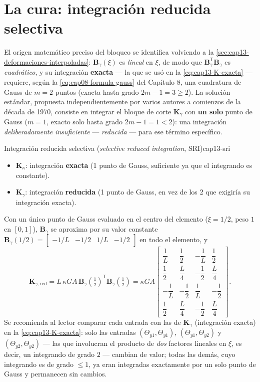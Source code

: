 \section{La cura: integración reducida selectiva}
\label{sec:cap13-integracion-reducida}

El origen matemático preciso del bloqueo se identifica volviendo a la \cref{sec:cap13-deformaciones-interpoladas}: $\bm B_\gamma(\xi)$ es \emph{lineal} en $\xi$, de modo que $\bm B_\gamma^{\mathsf T}\bm B_\gamma$ es \emph{cuadrático}, y su integración \textbf{exacta} --- la que se usó en la \cref{eq:cap13-K-exacta} --- requiere, según la \cref{eq:cap08-formula-gauss} del Capítulo 8, una cuadratura de Gauss de $m=2$ puntos (exacta hasta grado $2m-1=3\geq2$). La solución estándar, propuesta independientemente por varios autores a comienzos de la década de 1970, consiste en integrar el bloque de corte $\bm K_\gamma$ con \textbf{un solo} punto de Gauss ($m=1$, exacto solo hasta grado $2m-1=1<2$): una integración \emph{deliberadamente insuficiente} --- \emph{reducida} --- para ese término específico.

\begin{ecnimportante}{Integración reducida selectiva (\emph{selective reduced integration}, SRI)}{cap13-sri}
\begin{itemize}[leftmargin=1.6em]
  \item $\bm K_\kappa$: integración \textbf{exacta} (1 punto de Gauss, suficiente ya que el integrando es constante).
  \item $\bm K_\gamma$: integración \textbf{reducida} (1 punto de Gauss, en vez de los 2 que exigiría su integración exacta).
\end{itemize}
Con un único punto de Gauss evaluado en el centro del elemento ($\xi=1/2$, peso $1$ en $[0,1]$), $\bm B_\gamma$ se aproxima por su valor constante $\bm B_\gamma(1/2)=\begin{bmatrix}-1/L & -1/2 & 1/L & -1/2\end{bmatrix}$ en todo el elemento, y
\[
\bm K_{\gamma,\text{red}} = L\,\kappa GA\,\bm B_\gamma(\tfrac12)^{\mathsf T}\bm B_\gamma(\tfrac12) =
\kappa GA\begin{bmatrix}
\dfrac1L & \dfrac12 & -\dfrac1L & \dfrac12 \\[4pt]
\dfrac12 & \dfrac{L}{4} & -\dfrac12 & \dfrac{L}{4} \\[4pt]
-\dfrac1L & -\dfrac12 & \dfrac1L & -\dfrac12 \\[4pt]
\dfrac12 & \dfrac{L}{4} & -\dfrac12 & \dfrac{L}{4}
\end{bmatrix} .
\]
Se recomienda al lector comparar cada entrada con las de $\bm K_\gamma$ (integración exacta) en la \cref{eq:cap13-K-exacta}: solo las entradas $(\Theta_{y1},\Theta_{y1})$, $(\Theta_{y1},\Theta_{y2})$ y $(\Theta_{y2},\Theta_{y2})$ --- las que involucran el producto de \emph{dos} factores lineales en $\xi$, es decir, un integrando de grado $2$ --- cambian de valor; todas las demás, cuyo integrando es de grado $\leq1$, ya eran integradas exactamente por un solo punto de Gauss y permanecen sin cambios.
\end{ecnimportante}


